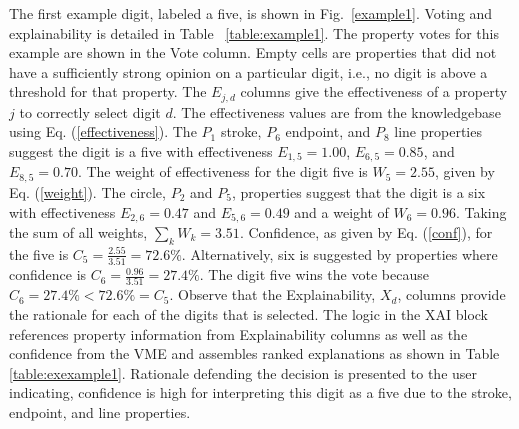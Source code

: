 \documentclass[conference]{IEEEtran}
\begin{document}
The first example digit, labeled a five, is shown in Fig.~\ref{example1}.  Voting and explainability is detailed in Table ~\ref{table:example1}.  The property votes for this example are shown in the Vote column.  Empty cells are properties that did not have a sufficiently strong opinion on a particular digit, i.e., no digit is above a threshold for that property.   The $E_{j,d}$ columns give the effectiveness of a property $j$ to correctly select digit $d$.  The effectiveness values are from the knowledgebase using Eq. (\ref{effectiveness}).   The $P_1$ stroke, $P_6$ endpoint, and $P_8$ line properties suggest the digit is a five with effectiveness $E_{1,5}= 1.00$, $E_{6,5}=0.85$, and $E_{8,5}=0.70$.  The weight of effectiveness for the digit five is $W_5=2.55$, given by Eq. (\ref{weight}).  The circle, $P_2$ and $P_5$, properties suggest that the digit is a six with effectiveness $E_{2,6}=0.47$ and $E_{5,6}=0.49$  and a weight of $W_6=0.96$.  Taking the sum of all weights, $\sum\limits_k W_k=3.51$.  Confidence, as given by Eq. (\ref{conf}), for the five is $C_5=\frac{2.55}{3.51} = 72.6\%$.  Alternatively, six is suggested by properties where confidence is $C_6=\frac{0.96}{3.51}=27.4\%$.  The digit five wins the vote because $C_6=27.4\% < 72.6\%=C_5$.  Observe that the Explainability, $X_d$, columns provide the rationale for each of the digits that is selected.  The logic in the XAI block references property information from Explainability columns as well as the confidence from the VME and assembles ranked explanations as shown in Table~ \ref{table:exexample1}.   Rationale defending the decision is presented to the user indicating, confidence is high for interpreting this digit as a five due to the stroke, endpoint, and line properties. 


\end{document}
